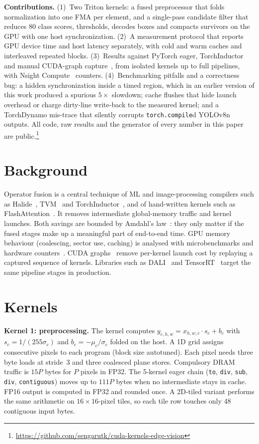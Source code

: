 \documentclass[10pt,twocolumn,letterpaper]{article}
\begin{document}
\noindent\textbf{Contributions.}
(1)~Two Triton kernels: a fused preprocessor that folds normalization into one FMA per element,
and a single-pass candidate filter that reduces 80 class scores, thresholds, decodes boxes and
compacts survivors on the GPU with one host synchronization.
(2)~A measurement protocol that reports GPU device time and host latency separately, with cold
and warm caches and interleaved repeated blocks.
(3)~Results against PyTorch eager, TorchInductor~\cite{ansel2024pytorch} and manual CUDA-graph
capture~\cite{nvidia2025cudaguide}, from isolated kernels up to full pipelines, with Nsight
Compute~\cite{nvidia2025nsightcompute} counters.
(4)~Benchmarking pitfalls and a correctness bug: a hidden synchronization inside a timed region,
which in an earlier version of this work produced a spurious $5\times$ slowdown; cache flushes that
hide launch overhead or charge dirty-line write-back to the measured kernel; and a TorchDynamo
mis-trace that silently corrupts \texttt{torch.compile}d YOLOv8n outputs.
All code, raw results and the generator of every number in this paper are public.\footnote{\url{https://github.com/sengarutk/cuda-kernels-edge-vision}}

\section{Background}
Operator fusion is a central technique of ML and image-processing compilers such as
Halide~\cite{ragankelley2013halide}, TVM~\cite{chen2018tvm} and TorchInductor~\cite{ansel2024pytorch},
and of hand-written kernels such as FlashAttention~\cite{dao2022flashattention}. It removes
intermediate global-memory traffic and kernel launches. Both savings are bounded by Amdahl's
law~\cite{amdahl1967validity}: they only matter if the fused stages make up a meaningful part of
end-to-end time. GPU memory behaviour (coalescing, sector use, caching) is analysed with
microbenchmarks and hardware counters~\cite{mei2017dissecting,nvidia2025nsightcompute}.
CUDA graphs~\cite{nvidia2025cudaguide} remove per-kernel launch cost by replaying a captured
sequence of kernels. Libraries such as DALI~\cite{nvidia2023dali} and TensorRT~\cite{nvidia2024tensorrt}
target the same pipeline stages in production.

\section{Kernels}
\noindent\textbf{Kernel 1: preprocessing.} The kernel computes
$y_{c,h,w} = x_{h,w,c}\cdot s_c + b_c$ with $s_c = 1/(255\sigma_c)$ and $b_c = -\mu_c/\sigma_c$ folded
on the host. A 1D grid assigns consecutive pixels to each program (block size autotuned). Each
pixel needs three byte loads at stride~3 and three coalesced plane stores. Compulsory DRAM traffic
is $15P$ bytes for $P$ pixels in FP32. The 5-kernel eager chain (\texttt{to}, \texttt{div},
\texttt{sub}, \texttt{div}, \texttt{contiguous}) moves up to $111P$ bytes when no intermediate stays
in cache. FP16 output is computed in FP32 and rounded once. A 2D-tiled variant performs the
same arithmetic on $16{\times}16$-pixel tiles, so each tile row touches only 48 contiguous input bytes.
\end{document}
